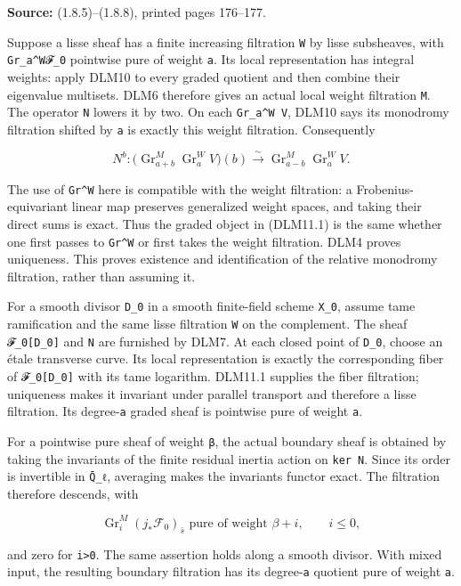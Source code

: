 \documentclass[
]{report}
\begin{document}
\textbf{Source:} (1.8.5)--(1.8.8), printed pages 176--177.

Suppose a lisse sheaf has a finite increasing filtration \texttt{W} by
lisse subsheaves, with \texttt{Gr\_a\^{}W𝓕\_0} pointwise pure of weight
\texttt{a}. Its local representation has integral weights: apply DLM10
to every graded quotient and then combine their eigenvalue multisets.
DLM6 therefore gives an actual local weight filtration \texttt{M}. The
operator \texttt{N} lowers it by two. On each \texttt{Gr\_a\^{}W\ V},
DLM10 says its monodromy filtration shifted by \texttt{a} is exactly
this weight filtration. Consequently

\[
N^b:\bigl(\operatorname{Gr}_{a+b}^M\operatorname{Gr}_a^W V\bigr)(b)
\xrightarrow{\sim}\operatorname{Gr}_{a-b}^M\operatorname{Gr}_a^W V.
\tag{DLM11.1}
\]

The use of \texttt{Gr\^{}W} here is compatible with the weight
filtration: a Frobenius-equivariant linear map preserves generalized
weight spaces, and taking their direct sums is exact. Thus the graded
object in (DLM11.1) is the same whether one first passes to
\texttt{Gr\^{}W} or first takes the weight filtration. DLM4 proves
uniqueness. This proves existence and identification of the relative
monodromy filtration, rather than assuming it.

For a smooth divisor \texttt{D\_0} in a smooth finite-field scheme
\texttt{X\_0}, assume tame ramification and the same lisse filtration
\texttt{W} on the complement. The sheaf \texttt{𝓕\_0{[}D\_0{]}} and
\texttt{N} are furnished by DLM7. At each closed point of \texttt{D\_0},
choose an étale transverse curve. Its local representation is exactly
the corresponding fiber of \texttt{𝓕\_0{[}D\_0{]}} with its tame
logarithm. DLM11.1 supplies the fiber filtration; uniqueness makes it
invariant under parallel transport and therefore a lisse filtration. Its
degree-\texttt{a} graded sheaf is pointwise pure of weight \texttt{a}.

For a pointwise pure sheaf of weight \texttt{β}, the actual boundary
sheaf is obtained by taking the invariants of the finite residual
inertia action on \texttt{ker\ N}. Since its order is invertible in
\texttt{Q̄\_ℓ}, averaging makes the invariants functor exact. The
filtration therefore descends, with

\[
\operatorname{Gr}_i^M(j_*\mathcal F_0)_{\bar s}
\text{ pure of weight }\beta+i,\qquad i\le0,
\]

and zero for \texttt{i\textgreater{}0}. The same assertion holds along a
smooth divisor. With mixed input, the resulting boundary filtration has
its degree-\texttt{a} quotient pure of weight \texttt{a}.
\end{document}
